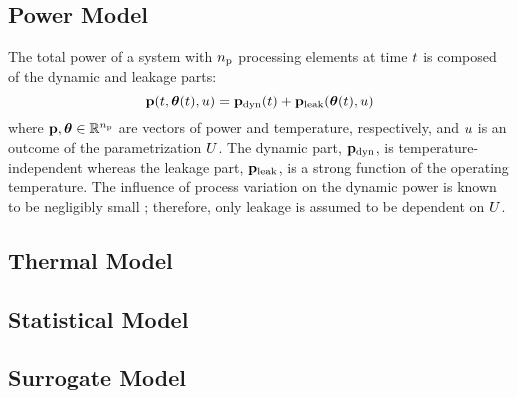 \subsection{Power Model} 
The total power of a system with ${n_\text{p}}$ processing elements at time $t$ is composed of the dynamic and leakage parts:
\begin{equation} \elabel{total-power}
  \vP(\t, \vT(\t), \u) = \vP_\dyn(\t) + \vP_\leak(\vT(\t), \u)
\end{equation}
where $\mathbf{p}, \boldsymbol\theta \in \mathbb{R}^{n_\text{p}}$ are vectors of power and temperature, respectively, and $u$ is an outcome of the parametrization $U$. The dynamic part, $\mathbf{p}_{\text{dyn}}$, is temperature-independent whereas the leakage part, $\mathbf{p}_{\text{leak}}$, is a strong function of the operating temperature. The influence of process variation on the dynamic power is known to be negligibly small \cite{srivastava2010}; therefore, only leakage is assumed to be dependent on $U$.

\subsection{Thermal Model} 


\subsection{Statistical Model} 


\subsection{Surrogate Model} 

